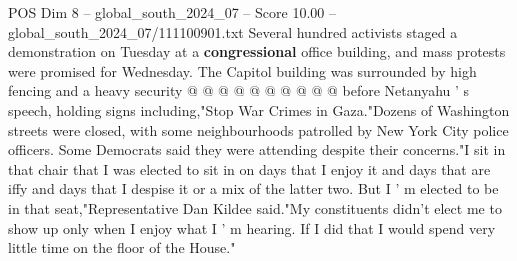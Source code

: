 \begin{textsample}{POS Dim 8 – global\_south\_2024\_07 – Score 10.00 – global\_south\_2024\_07/111100901.txt}
Several hundred activists staged a demonstration on Tuesday at a \textbf{congressional} office building, and mass protests were promised for Wednesday.
The Capitol building was surrounded by high fencing and a heavy security @ @ @ @ @ @ @ @ @ @ before Netanyahu ' s speech, holding signs including,"Stop War Crimes in Gaza."Dozens of Washington streets were closed, with some neighbourhoods patrolled by New York City police officers.
Some Democrats said they were attending despite their concerns."I sit in that chair that I was elected to sit in on days that I enjoy it and days that are iffy and days that I despise it or a mix of the latter two.
But I ' m elected to be in that seat,"Representative Dan Kildee said."My constituents didn't elect me to show up only when I enjoy what I ' m hearing.
If I did that I would spend very little time on the floor of the House."

\end{textsample}
